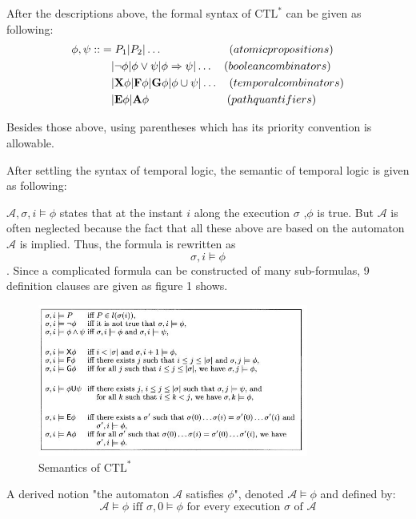 \documentclass[11pt, conference]{IEEEtran}
\begin{document}
    After the descriptions above, the formal syntax of $\text{CTL}^*$ can be given as following:
    \begin{equation*}
      \begin{split}
         \phi,\psi :: & = P_1|P_2|\dots   \qquad\qquad\qquad (atomic propositions)\\
           & \quad |\neg\phi|\phi \vee \psi|\phi \Rightarrow\psi|\dots \quad (boolean combinators)\\
           & \quad |\text{\textbf{X}}\phi|\text{\textbf{F}}\phi|\text{\textbf{G}}\phi|\phi \cup \psi|\dots \quad(temporal combinators)\\
           & \quad |\text{\textbf{E}}\phi|\text{\textbf{A}}\phi \qquad\qquad\qquad\quad (path quantifiers)
      \end{split}
    \end{equation*}

    Besides those above, using parentheses which has its priority convention is allowable. 
    
    After settling the syntax of temporal logic, the semantic of temporal logic is given as following:
    
    $\mathcal{A}, \sigma, i \models \phi $ states that at the instant $i$ along the execution $\sigma$ ,$\phi$ is true. But $\mathcal{A}$ is often neglected because the fact that all these above are based on the automaton $\mathcal{A}$ is implied. Thus, the formula is rewritten as $$\sigma, i \models \phi $$. Since a complicated formula can be constructed of many sub-formulas, 9 definition clauses are given as figure 1 shows.
    \begin{figure}
         \centering
        \includegraphics[width=3.5in]{2_3.jpg}
        \caption{Semantics of $\text{CTL}^*$}
    \end{figure}
    
    A derived notion "the automaton $\mathcal{A}$ satisfies $\phi$", denoted $\mathcal{A}\models\phi$ and defined by:
    \begin{equation*}
      \mathcal{A}\models \phi \text{ iff } \sigma,0\models\phi \text{ for every execution } \sigma \text{ of } \mathcal{A}
    \end{equation*}
    
\end{document}
